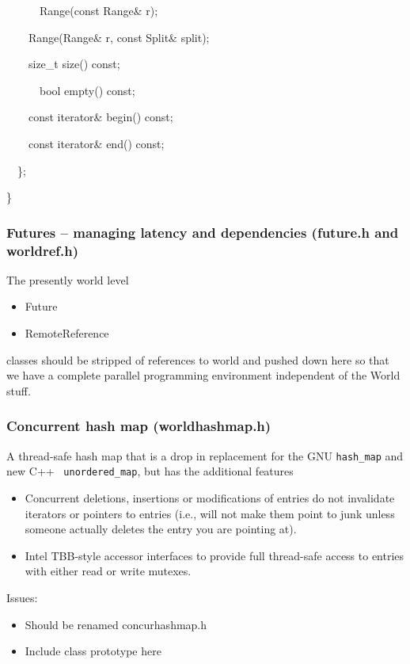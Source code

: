 \documentclass[letterpaper]{article}
\newcommand\liststyleLiii{%
\renewcommand\labelitemi{${\bullet}$}
\renewcommand\labelitemii{${\circ}$}
\renewcommand\labelitemiii{${\blacksquare}$}
\renewcommand\labelitemiv{${\bullet}$}
}
\newcommand\liststyleLiv{%
\renewcommand\labelitemi{${\bullet}$}
\renewcommand\labelitemii{${\circ}$}
\renewcommand\labelitemiii{${\blacksquare}$}
\renewcommand\labelitemiv{${\bullet}$}
}
\newcommand\liststyleLv{%
\renewcommand\labelitemi{${\bullet}$}
\renewcommand\labelitemii{${\circ}$}
\renewcommand\labelitemiii{${\blacksquare}$}
\renewcommand\labelitemiv{${\bullet}$}
}
\begin{document}
\bigskip

{\ttfamily
\ \ \ \ \ \ Range(const Range\& r);}

{\ttfamily
\ \ \ \ Range(Range\& r, const Split\& split);}

{\ttfamily
\ \ \ \ size\_t size() const;}

{\ttfamily
\ \ \ \ \ \ bool empty() const;}

{\ttfamily
\ \ \ \ const iterator\& begin() const;}

{\ttfamily
\ \ \ \ const iterator\& end() const;}

{\ttfamily
\ \ \};}

{\ttfamily
\}}

\subsubsection[Futures {}-- managing latency and dependencies (future.h and worldref.h)]{Futures -- managing latency
and dependencies (future.h and worldref.h)}
The presently world level

\liststyleLiii
\begin{itemize}
\item {\ttfamily
Future}
\item {\ttfamily
RemoteReference}
\end{itemize}
classes should be stripped of references to world and pushed down here so that we have a complete parallel programming
environment independent of the World stuff.

\subsubsection{Concurrent hash map (worldhashmap.h)}
A thread-safe hash map that is a drop in replacement for the GNU \texttt{hash\_map} and new C++
\ \texttt{unordered\_map}, but has the additional features

\liststyleLiv
\begin{itemize}
\item Concurrent deletions, insertions or modifications of entries do not invalidate iterators or pointers to entries
(i.e., will not make them point to junk unless someone actually deletes the entry you are pointing at).
\item Intel TBB-style accessor interfaces to provide full thread-safe access to entries with either read or write
mutexes.
\end{itemize}
Issues:

\liststyleLv
\begin{itemize}
\item Should be renamed concurhashmap.h
\item Include class prototype here
\end{itemize}
\end{document}

